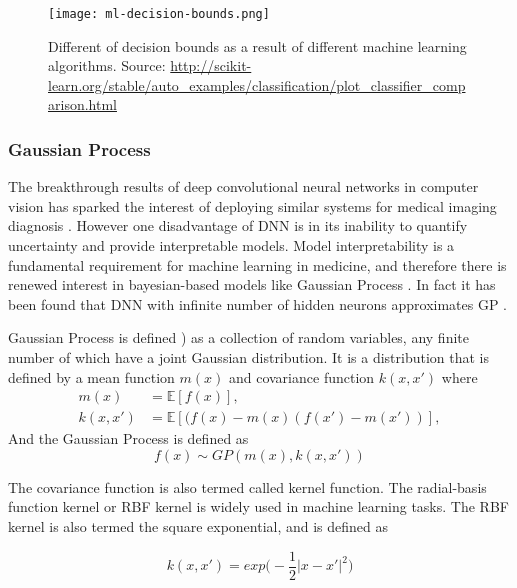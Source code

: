 \begin{figure}[h]
\texttt{[image: ml-decision-bounds.png]}
\caption{Different of decision bounds as a result of different machine learning algorithms. Source: \protect\url{http://scikit-learn.org/stable/auto_examples/classification/plot_classifier_comparison.html} }\label{fig:ml-bounds}
 \end{figure}

\subsubsection{Gaussian Process}
The breakthrough results of deep convolutional neural networks in computer vision \cite{Krizhevsky2012} has sparked the interest of deploying similar systems for medical imaging diagnosis \cite{Greenspan2016}. However one disadvantage of DNN is in its inability to quantify uncertainty and provide interpretable models. Model interpretability is a fundamental requirement for machine learning in medicine, and therefore there is renewed interest in bayesian-based models like Gaussian Process \cite{gal2016dropout}. In fact it has been found that DNN with infinite number of hidden neurons approximates GP \cite{neal1996priors}. 

Gaussian Process is defined \cite{rasmussen2006gaussian}) as a collection of random variables, any finite number of which have a joint Gaussian distribution. 
It is a distribution that is defined by a mean function $m(x)$ and covariance function $k(x,x') $ where
\begin{equation}
	\begin{split}
		m(x) &= \mathbb{E}[f(x)], \\
		k(x,x') &= \mathbb{E}[(f(x)-m(x)(f(x')-m(x'))],
	\end{split}
\end{equation}
And the Gaussian Process is defined as
\begin{equation}
f(x) \sim GP(m(x), k(x, x')) 
\end{equation}


The covariance function is also termed called kernel function. The radial-basis function kernel or RBF kernel is widely used in machine learning tasks. The RBF kernel is also termed the square exponential, and is defined as

\begin{equation}
k(x, x') = exp\bigg( -\frac{1}{2}|x - x'|^2\bigg)
\end{equation} 

